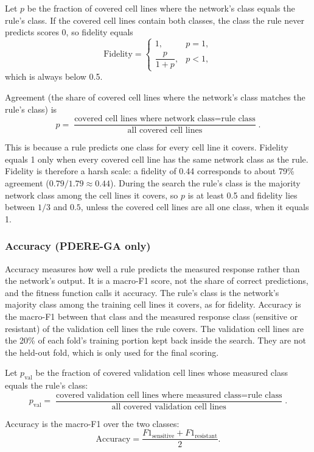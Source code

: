 Let $p$ be the fraction of covered cell lines where the network's class equals the rule's class. If the covered cell lines contain both classes, the class the rule never predicts scores 0, so fidelity equals
\[
  \text{Fidelity} =
  \begin{cases}
    1, & p = 1,\\[4pt]
    \dfrac{p}{1+p}, & p < 1,
  \end{cases}
\]
which is always below 0.5.

Agreement (the share of covered cell lines where the network's class matches the rule's class) is
\[
  p = \frac{\text{covered cell lines where network class} = \text{rule class}}{\text{all covered cell lines}}.
\]

This is because a rule predicts one class for every cell line it covers. Fidelity equals 1 only when every covered cell line has the same network class as the rule. Fidelity is therefore a harsh scale: a fidelity of 0.44 corresponds to about 79\% agreement ($0.79/1.79 \approx 0.44$). During the search the rule's class is the majority network class among the cell lines it covers, so $p$ is at least 0.5 and fidelity lies between $1/3$ and $0.5$, unless the covered cell lines are all one class, when it equals 1.

\subsubsection{Accuracy (PDERE-GA only)}
\label{sec:accuracy-measure}

Accuracy measures how well a rule predicts the measured response rather than the network's output. It is a macro-F1 score, not the share of correct predictions, and the fitness function calls it accuracy. The rule's class is the network's majority class among the training cell lines it covers, as for fidelity. Accuracy is the macro-F1 between that class and the measured response class (sensitive or resistant) of the validation cell lines the rule covers. The validation cell lines are the 20\% of each fold's training portion kept back inside the search. They are not the held-out fold, which is only used for the final scoring.

Let $p_{\text{val}}$ be the fraction of covered validation cell lines whose measured class equals the rule's class:
\[
  p_{\text{val}} = \frac{\text{covered validation cell lines where measured class} = \text{rule class}}{\text{all covered validation cell lines}}.
\]

Accuracy is the macro-F1 over the two classes:
\[
  \text{Accuracy} = \frac{F1_{\text{sensitive}} + F1_{\text{resistant}}}{2}.
\]

